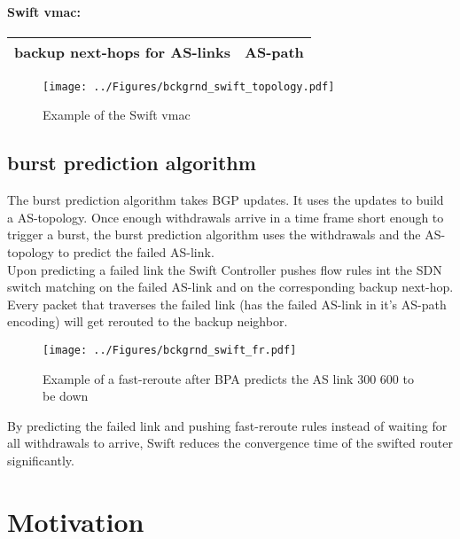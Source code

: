 \paragraph{\label{chapter2:Swift:Swift vmac}Swift vmac:}

\begin{tabular}{|r|l|}
  \hline 
  backup next-hops for AS-links & AS-path \\
  \hline
\end{tabular}


\begin{figure}[h]
\center
\texttt{[image: ../Figures/bckgrnd\_swift\_topology.pdf]}
\caption{Example of the Swift vmac}
\end{figure}


\subsection{\label{chapter2:Swift:burst prediciton algorithm}burst prediction algorithm}
The burst prediction algorithm takes BGP updates. It uses the updates to build a AS-topology. Once enough withdrawals arrive in a time frame short enough to trigger a burst, the burst prediction algorithm uses the withdrawals and the AS-topology to predict the failed AS-link. \\
Upon predicting a failed link the Swift Controller pushes flow rules int the SDN switch matching on the failed AS-link and on the corresponding backup next-hop. \\
Every packet that traverses the failed link (has the failed AS-link in it's AS-path encoding) will get rerouted to the backup neighbor.
\begin{figure}[h]
\center
\texttt{[image: ../Figures/bckgrnd\_swift\_fr.pdf]}
\caption{Example of a fast-reroute after BPA predicts the AS link 300 600 to be down}
\end{figure}

By predicting the failed link and pushing fast-reroute rules instead of waiting for all withdrawals to arrive, Swift reduces the convergence time of the swifted router significantly.


\section{\label{chapter2:Motivation}Motivation}

